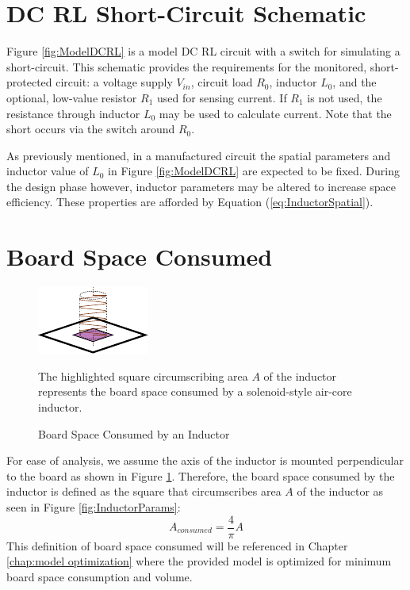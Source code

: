\documentclass[11pt,oneside]{report}
\begin{document}
    \section*{DC RL Short-Circuit Schematic}
    Figure \ref{fig:ModelDCRL} is a model DC RL circuit with a switch for simulating a short-circuit. This schematic provides the requirements for the monitored, short-protected circuit: a voltage supply $V_{in}$, circuit load $R_{0}$, inductor $L_{0}$, and the optional, low-value resistor $R_{1}$ used for sensing current. If $R_{1}$ is not used, the resistance through inductor $L_{0}$ may be used to calculate current. Note that the short occurs via the switch around $R_{0}$.
    
    As previously mentioned, in a manufactured circuit the spatial parameters and inductor value of $L_0$ in Figure \ref{fig:ModelDCRL} are expected to be fixed. During the design phase however, inductor parameters may be altered to increase space efficiency. These properties are afforded by Equation (\ref{eq:InductorSpatial}).
    
    \section*{Board Space Consumed}
    \begin{figure}
    	\centering
        \includegraphics[scale=2.0]{img/Inductor_Perpendicular_Mount.pdf}
        \caption{Board Space Consumed by an Inductor} The highlighted square circumscribing area $A$ of the inductor represents the board space consumed by a solenoid-style air-core inductor.
        \label{fig:BoardSpaceConsumed}
    \end{figure}
    For ease of analysis, we assume the axis of the inductor is mounted perpendicular to the board as shown in Figure \ref{fig:BoardSpaceConsumed}. Therefore, the board space consumed by the inductor is defined as the square that circumscribes area $A$ of the inductor as seen in Figure \ref{fig:InductorParams}:
    \begin{equation}\label{eq:AreaConsumed}
    A_{consumed} = \frac{4}{\pi}A
    \end{equation}
    This definition of board space consumed will be referenced in Chapter \ref{chap:model optimization} where the provided model is optimized for minimum board space consumption and volume.
\end{document}
